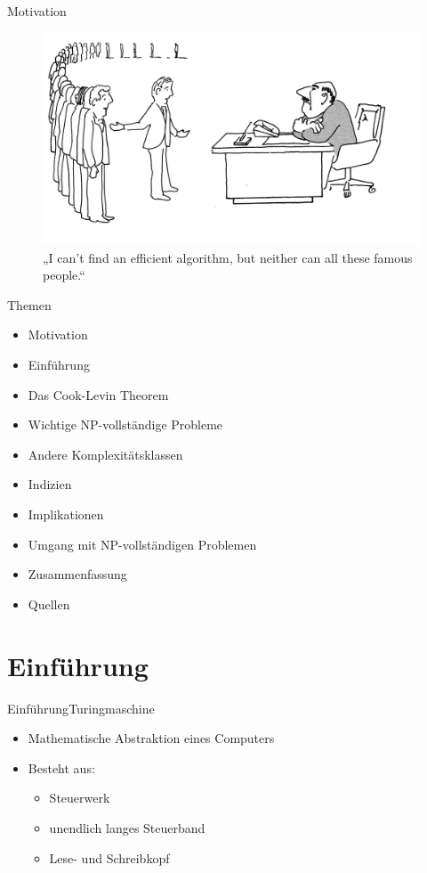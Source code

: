 \documentclass[ignorenonframetext,]{beamer}
\begin{document}
\begin{frame}{Motivation}
	\begin{figure}
		\centering
		\includegraphics{img/Comic3.png}\\
		{\small „I can't find an efficient algorithm, but neither can all these famous people.“}
	\end{figure}
\end{frame}


\begin{frame}{Themen}
\begin{itemize}
	\item Motivation
	\item Einführung
	\item Das Cook-Levin Theorem
	\item Wichtige NP-vollständige Probleme
	\item Andere Komplexitätsklassen
	\item Indizien
	\item Implikationen
	\item Umgang mit NP-vollständigen Problemen
	\item Zusammenfassung
	\item Quellen
\end{itemize}
\end{frame}


\section{Einführung}\label{einfuxfchrung}

\begin{frame}{Einführung}{Turingmaschine}
\begin{itemize}
\itemsep1pt\parskip0pt
\item
  Mathematische Abstraktion eines Computers
\item
  Besteht aus:

  \begin{itemize}
  \itemsep1pt\parskip0pt
  \item
    Steuerwerk
  \item
    unendlich langes Steuerband
  \item
    Lese- und Schreibkopf
  \end{itemize}
\end{itemize}

\end{frame}
\end{document}

